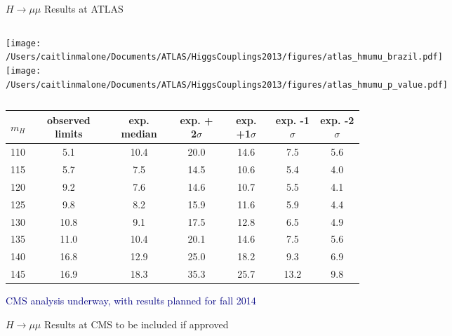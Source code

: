 \documentclass{beamer}
\begin{document}
\begin{frame}{$H\rightarrow\mu\mu$ Results at ATLAS}
	\begin{columns}
		\column{2.5in}
			\texttt{[image: /Users/caitlinmalone/Documents/ATLAS/HiggsCouplings2013/figures/atlas\_hmumu\_brazil.pdf]}
		\column{2.5in}
			\texttt{[image: /Users/caitlinmalone/Documents/ATLAS/HiggsCouplings2013/figures/atlas\_hmumu\_p\_value.pdf]}			
	\end{columns}
	
	\begin{table}
	\scriptsize
	\begin{tabular}{c | c | c | c | c | c | c } 
	\hline 
	$m_H$ & observed limits & exp. median & exp. + 2$\sigma$ & exp. +1$\sigma$ & exp. -1$\sigma$ & exp. -2$\sigma$ \\ \hline
	110 & 5.1 & 10.4 & 20.0 & 14.6 & 7.5 & 5.6 \\
	115 & 5.7 & 7.5 & 14.5 & 10.6 & 5.4 & 4.0 \\
	120 & 9.2 & 7.6 & 14.6 & 10.7 & 5.5 & 4.1 \\
	\textcolor{BrickRed}{125} & \textcolor{BrickRed}{9.8} &\textcolor{BrickRed}{8.2} & \textcolor{BrickRed}{15.9} & \textcolor{BrickRed}{11.6} & \textcolor{BrickRed}{5.9} & \textcolor{BrickRed}{4.4} \\
	130 & 10.8 & 9.1 & 17.5 & 12.8 & 6.5 & 4.9 \\
	135 & 11.0 & 10.4 & 20.1 & 14.6 & 7.5 & 5.6 \\
	140 & 16.8 & 12.9 & 25.0 & 18.2 & 9.3 & 6.9 \\
	145 & 16.9 & 18.3 & 35.3 & 25.7 & 13.2 & 9.8 \\ \hline
	\end{tabular}
	\end{table}
	\scriptsize\textcolor{Navy}{CMS analysis underway, with results planned for fall 2014}
\end{frame}


\begin{frame}{$H\rightarrow\mu\mu$ Results at CMS}
to be included if approved
\end{frame}
\end{document}
